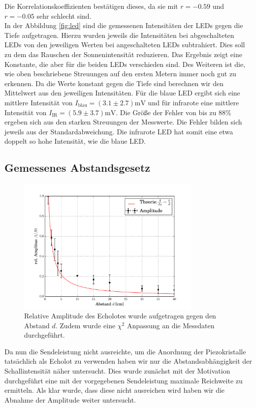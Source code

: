 \documentclass[12pt,a4paper,titlepage,headinclude,bibtotoc]{scrartcl}
\numberwithin{equation}{subsection}
\begin{document}
Die Korrelationskoeffizienten bestätigen dieses, da sie mit $r=-0.59$ und $r=-0.05$ sehr schlecht sind.\\
In der Abbildung \ref{fig:led} sind die gemessenen Intensitäten der LEDs gegen die Tiefe aufgetragen.
Hierzu wurden jeweils die Intensitäten bei abgeschalteten LEDs von den jeweiligen Werten bei angeschalteten LEDs subtrahiert.
Dies soll zu dem das Rauschen der Sonnenintensität reduzieren.
Das Ergebnis zeigt eine Konstante, die aber für die beiden LEDs verschieden sind.
Des Weiteren ist die, wie oben beschriebene Streuungen auf den ersten Metern immer noch gut zu erkennen.
Da die Werte konstant gegen die Tiefe sind berechnen wir den Mittelwert aus den jeweiligen Intensitäten.
Für die blaue LED ergibt sich eine mittlere Intensität von $I_\text{blau}=(3.1\pm2.7)\si{\milli\volt}$ und für infrarote eine mittlere Intensität von $I_\text{IR}=(5.9\pm3.7)\si{\milli\volt}$.
Die Größe der Fehler von bis zu 88\% ergeben sich aus den starken Streuungen der Messwerte.
Die Fehler bilden sich jeweils aus der Standardabweichung.
Die infrarote LED hat somit eine etwa doppelt so hohe Intensität, wie die blaue LED.

\subsection{Gemessenes Abstandsgesetz}
\begin{figure}[h]
	\centering
	\includegraphics[width=0.8\textwidth]{schall.pdf}
	\caption{Relative Amplitude des Echolotes wurde aufgetragen gegen den Abstand $d$. Zudem wurde eine $\chi^2$ Anpassung an die Messdaten durchgeführt.}
	\label{fig:schall}
\end{figure}
Da nun die Sendeleistung nicht ausreichte, um die Anordnung der Piezokristalle tatsächlich als Echolot zu verwenden haben wir nur die Abstandsabhängigkeit der Schallintensität näher untersucht. 
Dies wurde zunächst mit der Motivation durchgeführt eine mit der vorgegebenen Sendeleistung maximale Reichweite zu ermitteln. Als klar wurde, dass diese nicht ausreichen wird haben wir
die Abnahme der Amplitude weiter untersucht.
\end{document}
